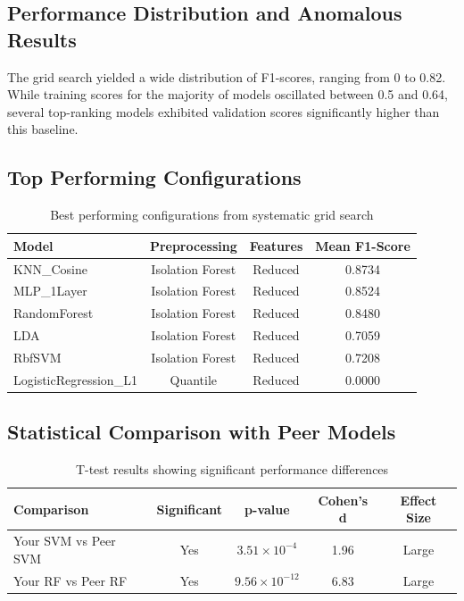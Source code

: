 \documentclass[11pt]{article}
\begin{document}
\subsection{Performance Distribution and Anomalous Results}
The grid search yielded a wide distribution of F1-scores, ranging from 0 to 0.82. While training scores for the majority of models oscillated between 0.5 and 0.64, several top-ranking models exhibited validation scores significantly higher than this baseline.

\subsection{Top Performing Configurations}
\begin{table}[h!]
\centering
\scriptsize
\begin{tabular}{lccc}
\toprule
\textbf{Model} & \textbf{Preprocessing} & \textbf{Features} & \textbf{Mean F1-Score} \\
\midrule
KNN\_Cosine & Isolation Forest & Reduced & 0.8734 \\
MLP\_1Layer & Isolation Forest & Reduced & 0.8524 \\
RandomForest & Isolation Forest & Reduced & 0.8480 \\
LDA & Isolation Forest & Reduced & 0.7059 \\
RbfSVM & Isolation Forest & Reduced & 0.7208 \\
LogisticRegression\_L1 & Quantile & Reduced & 0.0000 \\
\bottomrule
\end{tabular}
\caption{Best performing configurations from systematic grid search}
\label{tab:top_models}
\end{table}

\subsection{Statistical Comparison with Peer Models}

\begin{table}[h!]
\centering
\scriptsize
\begin{tabular}{lcccc}
\toprule
\textbf{Comparison} & \textbf{Significant} & \textbf{p-value} & \textbf{Cohen's d} & \textbf{Effect Size} \\
\midrule
Your SVM vs Peer SVM & Yes & $3.51 \times 10^{-4}$ & 1.96 & Large \\
Your RF vs Peer RF & Yes & $9.56 \times 10^{-12}$ & 6.83 & Large \\
\bottomrule
\end{tabular}
\caption{T-test results showing significant performance differences}
\label{tab:ttest_results}
\end{table}
\end{document}
